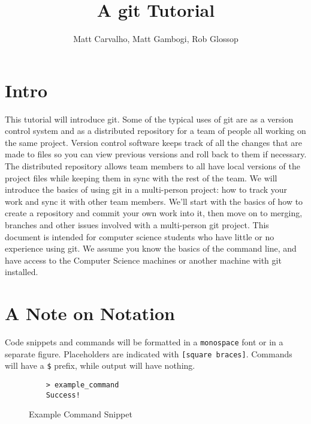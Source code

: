 \documentclass[11pt]{report}
\title{A git Tutorial}
\author{Matt Carvalho, Matt Gambogi, Rob Glossop}
\begin{document}
\thispagestyle{empty}
\maketitle

\clearpage {} 

\tableofcontents

\listoffigures

\clearpage {}
\section{Intro}
This tutorial will introduce git. Some of the typical uses of git are
as a version control system and as a distributed repository for a team
of people all working on the same project. Version control software
keeps track of all the changes that are made to files so you can view
previous versions and roll back to them if necessary.  The distributed
repository allows team members to all have local versions of the
project files while keeping them in sync with the rest of the team. We
will introduce the basics of using git in a multi-person project: how
to track your work and sync it with other team members. We'll start
with the basics of how to create a repository and commit your own work
into it, then move on to merging, branches and other issues involved
with a multi-person git project. This document is intended for
computer science students who have little or no experience using
git. We assume you know the basics of the command line, and have
access to the Computer Science machines or another machine with git
installed.

\section{A Note on Notation}
Code snippets and commands will be formatted in a \texttt{monospace} font or in
a separate figure. Placeholders are indicated with \texttt{[square
    braces]}. Commands will have a \texttt{\$} prefix, while output
will have nothing.
\begin{figure}[h]
  \caption{Example Command Snippet}
  \begin{lstlisting}
    > example_command
    Success!
  \end{lstlisting}
\end{figure}
\end{document}
